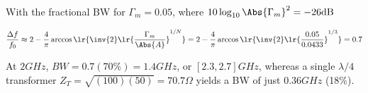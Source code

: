 
With the fractional BW for \( \Gamma_m = 0.05 \), where \( 10 \log_{10} \Abs{\Gamma_m}^2 = -26 \si{dB} \)

\begin{dmath}\label{eqn:uwavesDeck7MultisectionTransformersCore:920}
\frac{\Delta f}{f_0}
\approx 
2 - \frac{4}{\pi} \arccos\lr{ \inv{2} \lr{ \frac{\Gamma_m}{\Abs{A}} }^{1/N} }
=
2 - \frac{4}{\pi} \arccos\lr{ \inv{2} \lr{ \frac{0.05}{0.0433} }^{1/3} }
= 0.7
\end{dmath}

At \( 2 \si{GHz} \), \( BW = 0.7 (70\%) = 1.4 \si{GHz} \), or \( [2.3,2.7] \si{GHz} \), whereas a single \( \lambda/4 \) transformer \( Z_T = \sqrt{ (100)(50) } = 70.7 \Omega \) yields a BW of just \( 0.36 \si{GHz} \) (18\%).
